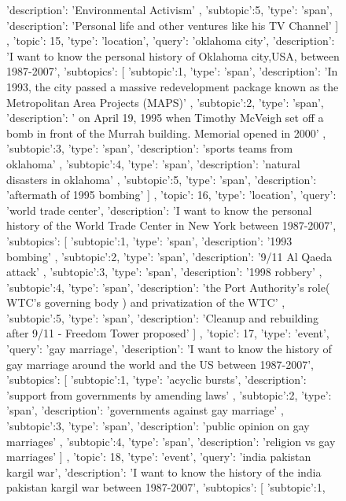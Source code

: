 \begin{figure}[ht]
{\begin{minipage}{\textwidth}
{{				'description': 'Environmental Activism'
			},
			{
				'subtopic':5,
				'type': 'span',
				'description': 'Personal life and other ventures like his TV Channel'
			}	
		]
	},
	{	
		'topic': 15,
		'type': 'location',
		'query': 'oklahoma city',
		'description': 'I want to know the personal history of Oklahoma city,USA, between 1987-2007',
		'subtopics': [
			{
				'subtopic':1,
				'type': 'span',
				'description': 'In 1993, the city passed a massive redevelopment package known as the Metropolitan Area Projects (MAPS)'
			},
			{
				'subtopic':2,
				'type': 'span',
				'description': ' on April 19, 1995 when Timothy McVeigh set off a bomb in front of the Murrah building. Memorial opened in 2000'
			},
			{
				'subtopic':3,
				'type': 'span',
				'description': 'sports teams from oklahoma'
			},
			{
				'subtopic':4,
				'type': 'span',
				'description': 'natural disasters in oklahoma'
			},
			{
				'subtopic':5,
				'type': 'span',
				'description': 'aftermath of 1995 bombing'
			}	
		]
	},
	{	
		'topic': 16,
		'type': 'location',
		'query': 'world trade center',
		'description': 'I want to know the personal history of the World Trade Center in New York between 1987-2007',
		'subtopics': [
			{
				'subtopic':1,
				'type': 'span',
				'description': '1993 bombing'
			},
			{
				'subtopic':2,
				'type': 'span',
				'description': '9/11 Al Qaeda attack'
			},
			{
				'subtopic':3,
				'type': 'span',
				'description': '1998 robbery'
			},
			{
				'subtopic':4,
				'type': 'span',
				'description': 'the Port Authority's role( WTC's governing body ) and privatization of the WTC'
			},
			{
				'subtopic':5,
				'type': 'span',
				'description': 'Cleanup and rebuilding after 9/11 - Freedom Tower proposed'
			}	
		]
	},
	{	
		'topic': 17,
		'type': 'event',
		'query': 'gay marriage',
		'description': 'I want to know the history of gay marriage around the world and the US between 1987-2007',
		'subtopics': [
			{
				'subtopic':1,
				'type': 'acyclic bursts',
				'description': 'support from governments by amending laws'
			},
			{
				'subtopic':2,
				'type': 'span',
				'description': 'governments against gay marriage'
			},
			{
				'subtopic':3,
				'type': 'span',
				'description': 'public opinion on gay marriages'
			},
			{
				'subtopic':4,
				'type': 'span',
				'description': 'religion vs gay marriages'
			}
		]
	},
	{	
		'topic': 18,
		'type': 'event',
		'query': 'india pakistan kargil war',
		'description': 'I want to know the history of the india pakistan kargil war between 1987-2007',
		'subtopics': [
			{
				'subtopic':1,
}}
\end{minipage}}
\end{figure}
